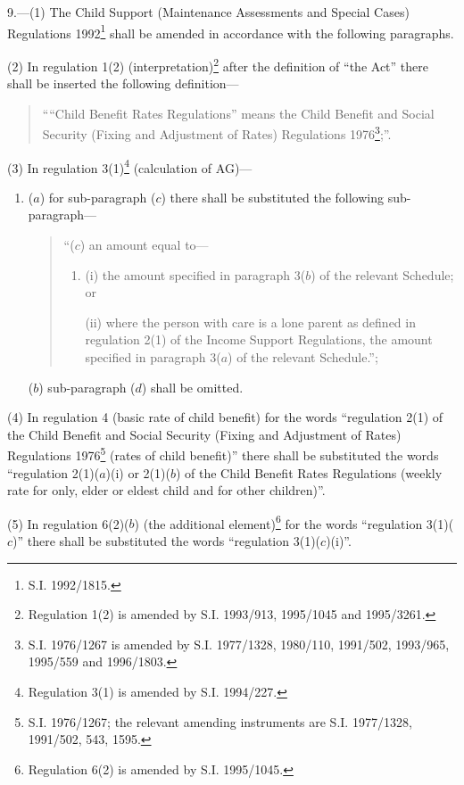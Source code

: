 \documentclass[a4paper]{article}
\newcommand\fnote[1]{\footnote{\frenchspacing #1}}
\begin{document}
9.---(1) The Child Support (Maintenance Assessments and Special Cases) Regulations 1992\fnote{S.I. 1992/1815.} shall be amended in accordance with the following paragraphs.

(2) In regulation 1(2) (interpretation)\footnote{\frenchspacing Regulation 1(2) is amended by S.I. 1993/913, 1995/1045 and 1995/3261.} after the definition of “the Act” there shall be inserted the following definition—
\begin{quotation}
““Child Benefit Rates Regulations” means the Child Benefit and Social Security (Fixing and Adjustment of Rates) Regulations 1976\footnote{\frenchspacing S.I. 1976/1267 is amended by S.I. 1977/1328, 1980/110, 1991/502, 1993/965, 1995/559 and 1996/1803.};”.
\end{quotation}

(3)  In regulation 3(1)\footnote{\frenchspacing Regulation 3(1) is amended by S.I. 1994/227.} (calculation of AG)—
\begin{enumerate}\item[]
($a$) for sub-paragraph ($c$) there shall be substituted the following sub-paragraph—
\begin{quotation}
“($c$) an amount equal to—
\begin{enumerate}\item[]
(i) the amount specified in paragraph 3($b$) of the relevant Schedule; or

(ii) where the person with care is a lone parent as defined in regulation 2(1) of the Income Support Regulations, the amount specified in paragraph 3($a$) of the relevant Schedule.”;
\end{enumerate}
\end{quotation}

($b$) sub-paragraph ($d$) shall be omitted.
\end{enumerate}

(4) In regulation 4 (basic rate of child benefit) for the words “regulation 2(1) of the Child Benefit and Social Security (Fixing and Adjustment of Rates) Regulations 1976\footnote{\frenchspacing S.I. 1976/1267; the relevant amending instruments are S.I. 1977/1328, 1991/502, 543, 1595.} (rates of child benefit)” there shall be substituted the words “regulation 2(1)($a$)(i) or 2(1)($b$) of the Child Benefit Rates Regulations (weekly rate for only, elder or eldest child and for other children)”.

(5)  In regulation 6(2)($b$) (the additional element)\footnote{\frenchspacing Regulation 6(2) is amended by S.I. 1995/1045.} for the words “regulation 3(1)($c$)” there shall be substituted the words “regulation 3(1)($c$)(i)”.
\end{document}
